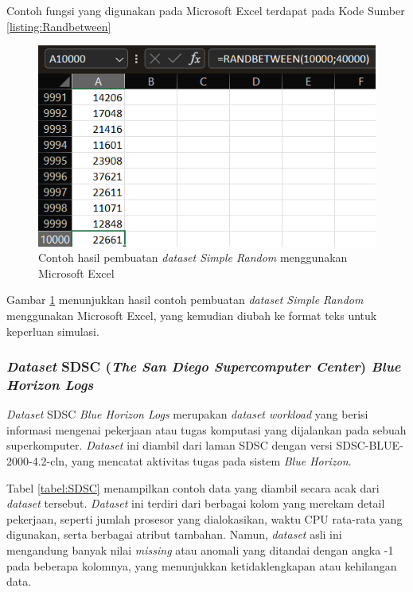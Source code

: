 Contoh fungsi yang digunakan pada Microsoft Excel terdapat pada Kode Sumber \ref{listing:Randbetween}

\begin{figure} [H]
    \centering
    \includegraphics[width=0.5\linewidth]{gambar/Dataset Simple Random.png}
    \caption{Contoh hasil pembuatan \textit{dataset Simple Random} menggunakan Microsoft Excel}
    \label{figure:Dataset Simple Random}
\end{figure}

Gambar \ref{figure:Dataset Simple Random} menunjukkan hasil contoh pembuatan \textit{dataset Simple Random} menggunakan Microsoft Excel, yang kemudian diubah ke format teks untuk keperluan simulasi.

\subsubsection{\textit{Dataset} SDSC (\textit{The San Diego Supercomputer Center}) \textit{Blue Horizon Logs}}
\textit{Dataset} SDSC \textit{Blue Horizon Logs} merupakan \textit{dataset workload} yang berisi informasi mengenai pekerjaan atau tugas komputasi yang dijalankan pada sebuah superkomputer. \textit{Dataset} ini diambil dari laman SDSC dengan versi SDSC-BLUE-2000-4.2-cln, yang mencatat aktivitas tugas pada sistem \textit{Blue Horizon}.

Tabel \ref{tabel:SDSC} menampilkan contoh data yang diambil secara acak dari \textit{dataset} tersebut. \textit{Dataset} ini terdiri dari berbagai kolom yang merekam detail pekerjaan, seperti jumlah prosesor yang dialokasikan, waktu CPU rata-rata yang digunakan, serta berbagai atribut tambahan. Namun, \textit{dataset} asli ini mengandung banyak nilai \textit{missing} atau anomali yang ditandai dengan angka -1 pada beberapa kolomnya, yang menunjukkan ketidaklengkapan atau kehilangan data.

